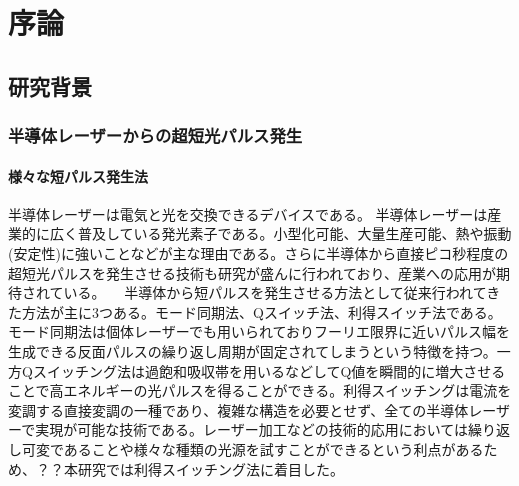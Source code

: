 \chapter{序論}
\section{研究背景}
\subsection{半導体レーザーからの超短光パルス発生}
\subsubsection{様々な短パルス発生法}
半導体レーザーは電気と光を交換できるデバイスである。																												
半導体レーザーは産業的に広く普及している発光素子である。小型化可能、大量生産可能、熱や振動(安定性)に強いことなどが主な理由である。さらに半導体から直接ピコ秒程度の超短光パルスを発生させる技術も研究が盛んに行われており、産業への応用が期待されている。
　半導体から短パルスを発生させる方法として従来行われてきた方法が主に3つある。モード同期法、Qスイッチ法、利得スイッチ法である。モード同期法は個体レーザーでも用いられておりフーリエ限界に近いパルス幅を生成できる反面パルスの繰り返し周期が固定されてしまうという特徴を持つ。一方Qスイッチング法は過飽和吸収帯を用いるなどしてQ値を瞬間的に増大させることで高エネルギーの光パルスを得ることができる。利得スイッチングは電流を変調する直接変調の一種であり、複雑な構造を必要とせず、全ての半導体レーザーで実現が可能な技術である。レーザー加工などの技術的応用においては繰り返し可変であることや様々な種類の光源を試すことができるという利点があるため、？？本研究では利得スイッチング法に着目した。

